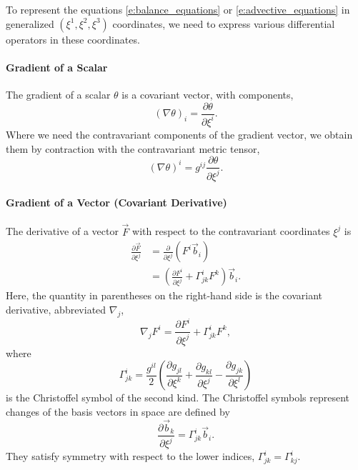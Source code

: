 \documentclass{report}
\begin{document}
To represent the equations \eqref{e:balance_equations} or \eqref{e:advective_equations} in generalized $(\xi^1, \xi^2, \xi^3)$ coordinates, we need to express various differential operators in these coordinates. 

\paragraph{Gradient of a Scalar} The gradient of a scalar $\theta$ is a covariant vector, with components,
\begin{equation}\label{e:scalar_gradient}
(\nabla \theta)_i = \frac{\partial \theta}{\partial \xi^i}.
\end{equation}
Where we need the contravariant components of the gradient vector, we obtain them by contraction with the contravariant metric tensor,
\[
(\nabla \theta)^i = g^{ij} \frac{\partial \theta}{\partial \xi^j}.
\]

\paragraph{Gradient of a Vector (Covariant Derivative)} The derivative of a vector $\vec{F}$ with respect to the contravariant coordinates $\xi^j$ is
\begin{equation}
\begin{split}
\frac{\partial \vec{F}}{\partial \xi^j} & = \frac{\partial}{\partial \xi^j} (F^i \vec{b}_i)\\
& = \left( \frac{\partial F^i}{\partial \xi^j} +  \Gamma^i_{jk} F^k \right) \vec{b}_i.
\end{split}
\end{equation}
Here, the quantity in parentheses on the right-hand side is the covariant derivative, abbreviated $\nabla_j$,
\begin{equation}
    \nabla_j F^i = \frac{\partial F^i}{\partial \xi^j} +  \Gamma^i_{jk} F^k,
\end{equation}
where
\begin{equation}
\Gamma^i_{jk} = \frac{g^{il}}{2} \left( \frac{\partial g_{jl}}{\partial \xi^k} + \frac{\partial g_{kl}}{\partial \xi^j} - \frac{\partial g_{jk}}{\partial \xi^l} \right)
\end{equation}
is the Christoffel symbol of the second kind. The Christoffel symbols represent changes of the basis vectors in space are defined by
\[
\frac{\partial\vec{b}_k}{\partial \xi^{j}} = \Gamma^{i}_{jk} \vec{b}_i.
\]
They satisfy symmetry with respect to the lower indices, $\Gamma^{i}_{jk} = \Gamma^{i}_{kj}$.
\end{document}

